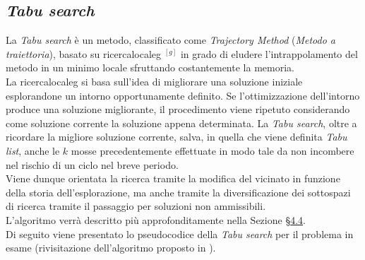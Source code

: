 \subsection{\textit{Tabu search}}
\noindent La \textit{Tabu search} \cite{siteS:dispense-de-giovanni} è un metodo, classificato come \textit{Trajectory Method} (\textit{Metodo a traiettoria}), basato su \gls{ricercalocaleg} $^{[g]}$
in grado di eludere l'intrappolamento del metodo in un minimo locale sfruttando costantemente la memoria.\\
La \gls{ricercalocaleg} si basa sull’idea di migliorare
una soluzione iniziale esplorandone un intorno
opportunamente definito. Se l’ottimizzazione
dell’intorno produce una soluzione migliorante,
il procedimento viene ripetuto
considerando come soluzione corrente la soluzione
appena determinata.
La \textit{Tabu search}, oltre a ricordare la migliore soluzione corrente, salva, in quella che viene definita \textit{Tabu list},
anche le {$k$} mosse precedentemente effettuate in modo tale da non incombere nel rischio di un ciclo nel breve periodo.\\
Viene dunque orientata la ricerca tramite la modifica del vicinato in funzione della storia dell'esplorazione, ma anche tramite la diversificazione dei sottospazi
di ricerca tramite il passaggio per soluzioni non ammissibili.\\
L'algoritmo verrà descritto più approfonditamente nella Sezione §\hyperref[sec:tabu-search]{4.4}.\\
Di seguito viene presentato lo pseudocodice della \textit{Tabu search} per il problema in esame (rivisitazione dell'algoritmo proposto in \cite{siteO:solid-github}).\\
